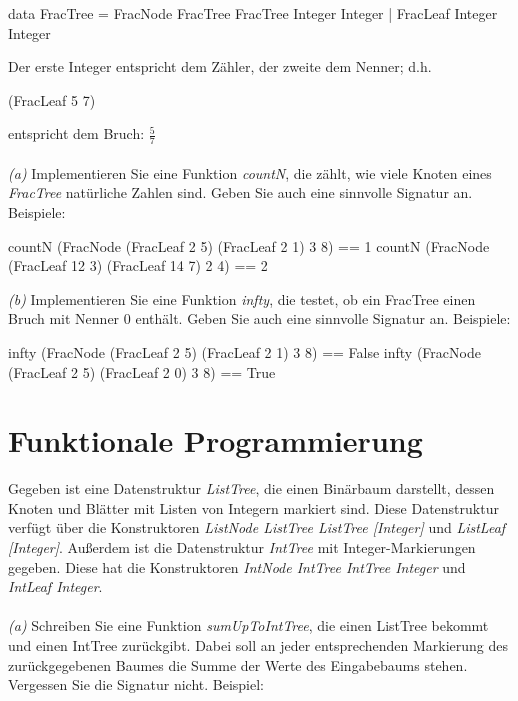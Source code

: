 \documentclass[11pt,a4paper,oneside,ngerman]{scrbook}
\begin{document}
\begin{code}
data FracTree = FracNode FracTree FracTree Integer Integer 
              | FracLeaf Integer Integer
\end{code}

Der erste Integer entspricht dem Zähler, der zweite dem Nenner; d.h.
\begin{code} 
(FracLeaf 5 7)
\end{code}
entspricht dem Bruch: $\frac57$
\\
\\
\emph{(a)} Implementieren Sie eine Funktion \emph{countN}, die zählt, wie viele Knoten eines \emph{FracTree} natürliche Zahlen sind. Geben Sie auch eine sinnvolle Signatur an.
Beispiele:
\begin{code}
  countN (FracNode (FracLeaf 2 5) (FracLeaf 2 1) 3 8) == 1
  countN (FracNode (FracLeaf 12 3) (FracLeaf 14 7) 2 4) == 2







\end{code}

\emph{(b)} Implementieren Sie eine Funktion \emph{infty}, die testet, ob ein FracTree einen Bruch mit Nenner 0 enthält. Geben Sie auch eine sinnvolle Signatur an.
Beispiele:
\begin{code}
  infty (FracNode (FracLeaf 2 5) (FracLeaf 2 1) 3 8) == False
  infty (FracNode (FracLeaf 2 5) (FracLeaf 2 0) 3 8) == True









\end{code}

\newpage


\section{Funktionale Programmierung}

Gegeben ist eine Datenstruktur \emph{ListTree}, die einen Binärbaum darstellt, dessen Knoten und Blätter mit Listen von Integern markiert sind. Diese Datenstruktur verfügt über die Konstruktoren \emph{ListNode ListTree ListTree [Integer]} und \emph{ListLeaf [Integer]}.
Außerdem ist die Datenstruktur \emph{IntTree} mit Integer-Markierungen gegeben. Diese hat die Konstruktoren \emph{IntNode IntTree IntTree Integer} und \emph{IntLeaf Integer}.
\\
\\
\emph{(a)} Schreiben Sie eine Funktion \emph{sumUpToIntTree}, die einen ListTree bekommt und einen IntTree zurückgibt. Dabei soll an jeder entsprechenden Markierung des zurückgegebenen Baumes die Summe der Werte des Eingabebaums stehen. Vergessen Sie die Signatur nicht. Beispiel:
\end{document}
